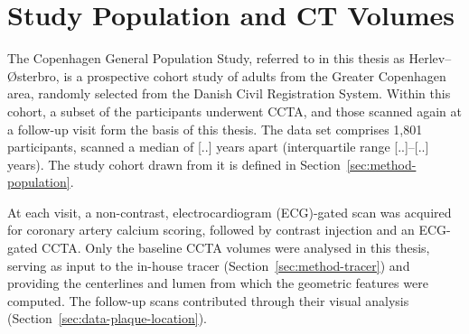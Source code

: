 \section{Study Population and CT Volumes}
\label{sec:data-cohort}

The Copenhagen General Population Study, referred to in this thesis as Herlev--{\O}sterbro, is a prospective cohort study of adults from the Greater Copenhagen area, randomly selected from the Danish Civil Registration System.
Within this cohort, a subset of the participants underwent CCTA, and those scanned again at a follow-up visit form the basis of this thesis.
The data set comprises 1,801 participants, scanned a median of [..] years apart (interquartile range [..]--[..] years).
The study cohort drawn from it is defined in Section~\ref{sec:method-population}.

At each visit, a non-contrast, electrocardiogram (ECG)-gated scan was acquired for coronary artery calcium scoring, followed by contrast injection and an ECG-gated CCTA.
Only the baseline CCTA volumes were analysed in this thesis, serving as input to the in-house tracer (Section~\ref{sec:method-tracer}) and providing the centerlines and lumen from which the geometric features were computed.
The follow-up scans contributed through their visual analysis (Section~\ref{sec:data-plaque-location}).
